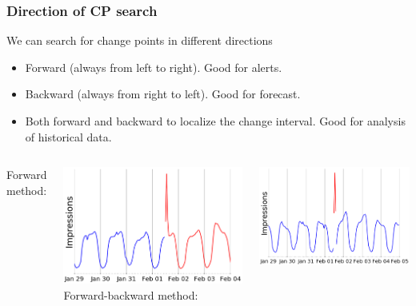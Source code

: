 \documentclass[intlimits, 9pt, unicode]{beamer}
\begin{document}
\begin{frame}
    \frametitle{Direction of CP search}
We can search for change points in different directions
\begin{itemize}
	\item Forward (always from left to right). Good for alerts.
\medskip
	\item Backward (always from right to left). Good for forecast.
\medskip
	\item Both forward and backward to localize the change interval. Good for analysis of historical data.
\end{itemize}

\smallskip
  \begin{columns}[T,onlytextwidth]
      Forward method:
      
      \vspace*{0.3cm}
	\includegraphics[scale=0.17]{images/022_point_cp_detected_2}
      Forward-backward method:

      \vspace*{0.3cm}
	\includegraphics[scale=0.17]{images/methods_comparison_4_3}
     \end{columns}


\end{frame}
\end{document}
